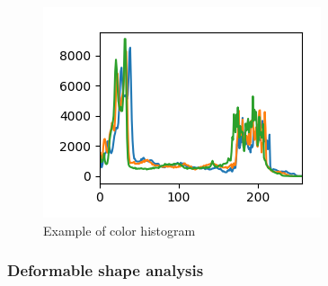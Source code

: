 \documentclass[conference]{IEEEtran}
\begin{document}
			\begin{figure}[!ht]
				\centerline{\includegraphics[width=\linewidth]{imgs/obama_histogram.png}}
				\caption{Example of color histogram}
				\label{fig:2}
			\end{figure}
			
			\subsubsection{Deformable shape analysis}
		
\end{document}
